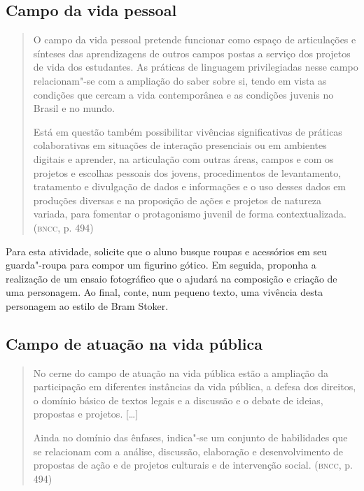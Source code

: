 \documentclass[12pt]{extarticle}
\begin{document}
\subsection{Campo da vida pessoal}

\begin{quote}
O campo da vida pessoal pretende funcionar como espaço de articulações
e sínteses das aprendizagens de outros campos postas a serviço dos
projetos de vida dos estudantes. As práticas de linguagem privilegiadas
nesse campo relacionam"-se com a ampliação do saber sobre si, tendo em
vista as condições que cercam a vida contemporânea e as condições
juvenis no Brasil e no mundo.

Está em questão também possibilitar vivências significativas de práticas
colaborativas em situações de interação presenciais ou em ambientes
digitais e aprender, na articulação com outras áreas, campos e com os
projetos e escolhas pessoais dos jovens, procedimentos de levantamento,
tratamento e divulgação de dados e informações e o uso desses dados em
produções diversas e na proposição de ações e projetos de natureza
variada, para fomentar o protagonismo juvenil de forma
contextualizada. (\textsc{bncc}, p. 494)
\end{quote}

Para esta atividade, solicite que o aluno busque roupas e acessórios
  em seu guarda"-roupa para compor um figurino gótico. Em seguida,
  proponha a realização de um ensaio fotográfico que o ajudará na
  composição e criação de uma personagem. Ao final, conte, num pequeno
  texto, uma vivência desta personagem ao estilo de Bram Stoker.

\subsection{Campo de atuação na vida pública}

\begin{quote}
No cerne do campo de atuação na vida pública estão a ampliação da
participação em diferentes instâncias da vida pública, a defesa dos
direitos, o domínio básico de textos legais e a discussão e o debate de
ideias, propostas e projetos. {[}\ldots{}{]}

Ainda no domínio das ênfases, indica"-se um conjunto de habilidades que
se relacionam com a análise, discussão, elaboração e desenvolvimento de
propostas de ação e de projetos culturais e de intervenção social.
(\textsc{bncc}, p. 494)
\end{quote}
\end{document}
